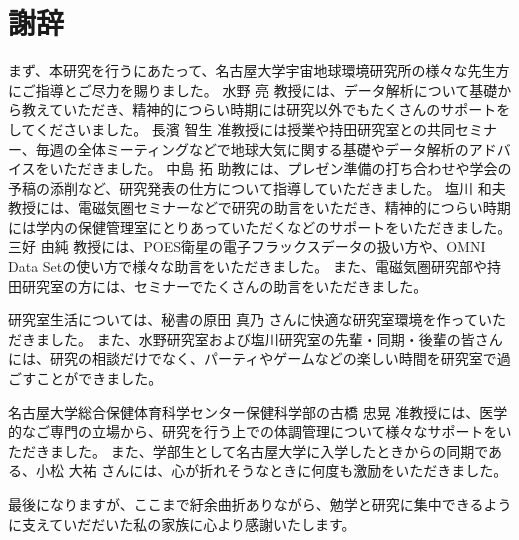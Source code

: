 \chapter*{謝辞}
まず、本研究を行うにあたって、名古屋大学宇宙地球環境研究所の様々な先生方にご指導とご尽力を賜りました。
水野 亮 教授には、データ解析について基礎から教えていただき、精神的につらい時期には研究以外でもたくさんのサポートをしてくださいました。
長濱 智生 准教授には授業や持田研究室との共同セミナー、毎週の全体ミーティングなどで地球大気に関する基礎やデータ解析のアドバイスをいただきました。
中島 拓 助教には、プレゼン準備の打ち合わせや学会の予稿の添削など、研究発表の仕方について指導していただきました。
塩川 和夫 教授には、電磁気圏セミナーなどで研究の助言をいただき、精神的につらい時期には学内の保健管理室にとりあっていただくなどのサポートをいただきました。
三好 由純 教授には、POES衛星の電子フラックスデータの扱い方や、OMNI Data Setの使い方で様々な助言をいただきました。
また、電磁気圏研究部や持田研究室の方には、セミナーでたくさんの助言をいただきました。
\par

研究室生活については、秘書の原田 真乃 さんに快適な研究室環境を作っていただきました。
また、水野研究室および塩川研究室の先輩・同期・後輩の皆さんには、研究の相談だけでなく、パーティやゲームなどの楽しい時間を研究室で過ごすことができました。\par

名古屋大学総合保健体育科学センター保健科学部の古橋 忠晃 准教授には、医学的なご専門の立場から、研究を行う上での体調管理について様々なサポートをいただきました。
また、学部生として名古屋大学に入学したときからの同期である、小松 大祐 さんには、心が折れそうなときに何度も激励をいただきました。\par

最後になりますが、ここまで紆余曲折ありながら、勉学と研究に集中できるように支えていだだいた私の家族に心より感謝いたします。
